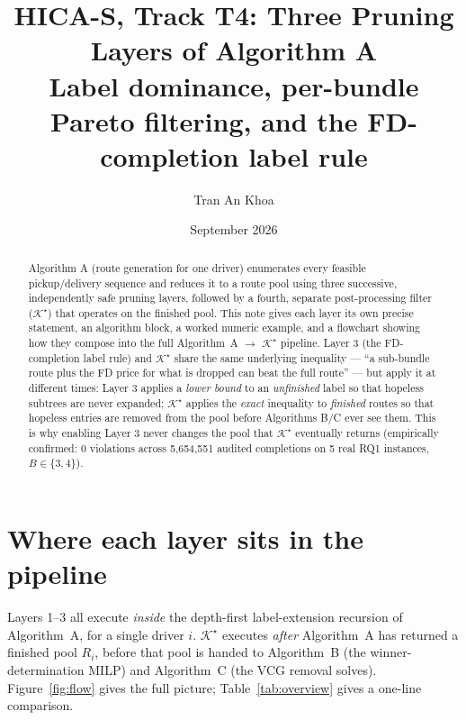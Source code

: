 \documentclass[11pt]{article}
\title{HICA-S, Track T4: Three Pruning Layers of Algorithm A\\
\large Label dominance, per-bundle Pareto filtering, and the FD-completion label rule}
\author{Tran An Khoa}
\date{September 2026}
\newcommand{\Ks}{\mathcal{K}^{\star}}
\begin{document}
\maketitle

\begin{abstract}
Algorithm A (route generation for one driver) enumerates every feasible pickup/delivery
sequence and reduces it to a route pool using three successive, independently safe pruning
layers, followed by a fourth, separate post-processing filter ($\Ks$) that operates on the
finished pool. This note gives each layer its own precise statement, an algorithm block, a
worked numeric example, and a flowchart showing how they compose into the full Algorithm~A
$\to$ $\Ks$ pipeline. Layer 3 (the FD-completion label rule) and $\Ks$ share the same
underlying inequality --- ``a sub-bundle route plus the FD price for what is dropped can beat
the full route'' --- but apply it at different times: Layer 3 applies a \emph{lower bound} to
an \emph{unfinished} label so that hopeless subtrees are never expanded; $\Ks$ applies the
\emph{exact} inequality to \emph{finished} routes so that hopeless entries are removed from
the pool before Algorithms B/C ever see them. This is why enabling Layer 3 never changes the
pool that $\Ks$ eventually returns (empirically confirmed: 0 violations across 5{,}654{,}551
audited completions on 5 real RQ1 instances, $B\in\{3,4\}$).
\end{abstract}

\tableofcontents

\section{Where each layer sits in the pipeline}

Layers 1--3 all execute \emph{inside} the depth-first label-extension recursion of
Algorithm~A, for a single driver $i$. $\Ks$ executes \emph{after} Algorithm~A has returned a
finished pool $R_i$, before that pool is handed to Algorithm~B (the winner-determination
MILP) and Algorithm~C (the VCG removal solves). Figure~\ref{fig:flow} gives the full picture;
Table~\ref{tab:overview} gives a one-line comparison.
\end{document}
